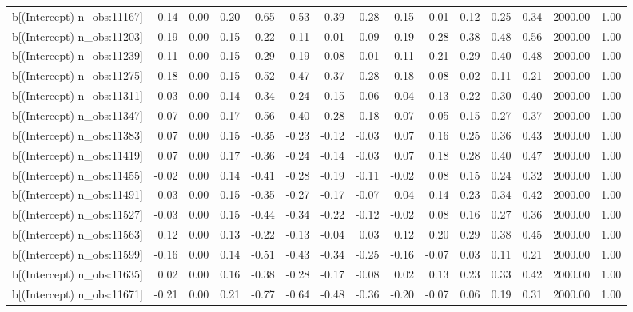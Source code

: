 \begin{table}[ht]
\begin{tabular}{rrrrrrrrrrrrrrr}
  b[(Intercept) n\_obs:11167] & -0.14 & 0.00 & 0.20 & -0.65 & -0.53 & -0.39 & -0.28 & -0.15 & -0.01 & 0.12 & 0.25 & 0.34 & 2000.00 & 1.00 \\ 
  b[(Intercept) n\_obs:11203] & 0.19 & 0.00 & 0.15 & -0.22 & -0.11 & -0.01 & 0.09 & 0.19 & 0.28 & 0.38 & 0.48 & 0.56 & 2000.00 & 1.00 \\ 
  b[(Intercept) n\_obs:11239] & 0.11 & 0.00 & 0.15 & -0.29 & -0.19 & -0.08 & 0.01 & 0.11 & 0.21 & 0.29 & 0.40 & 0.48 & 2000.00 & 1.00 \\ 
  b[(Intercept) n\_obs:11275] & -0.18 & 0.00 & 0.15 & -0.52 & -0.47 & -0.37 & -0.28 & -0.18 & -0.08 & 0.02 & 0.11 & 0.21 & 2000.00 & 1.00 \\ 
  b[(Intercept) n\_obs:11311] & 0.03 & 0.00 & 0.14 & -0.34 & -0.24 & -0.15 & -0.06 & 0.04 & 0.13 & 0.22 & 0.30 & 0.40 & 2000.00 & 1.00 \\ 
  b[(Intercept) n\_obs:11347] & -0.07 & 0.00 & 0.17 & -0.56 & -0.40 & -0.28 & -0.18 & -0.07 & 0.05 & 0.15 & 0.27 & 0.37 & 2000.00 & 1.00 \\ 
  b[(Intercept) n\_obs:11383] & 0.07 & 0.00 & 0.15 & -0.35 & -0.23 & -0.12 & -0.03 & 0.07 & 0.16 & 0.25 & 0.36 & 0.43 & 2000.00 & 1.00 \\ 
  b[(Intercept) n\_obs:11419] & 0.07 & 0.00 & 0.17 & -0.36 & -0.24 & -0.14 & -0.03 & 0.07 & 0.18 & 0.28 & 0.40 & 0.47 & 2000.00 & 1.00 \\ 
  b[(Intercept) n\_obs:11455] & -0.02 & 0.00 & 0.14 & -0.41 & -0.28 & -0.19 & -0.11 & -0.02 & 0.08 & 0.15 & 0.24 & 0.32 & 2000.00 & 1.00 \\ 
  b[(Intercept) n\_obs:11491] & 0.03 & 0.00 & 0.15 & -0.35 & -0.27 & -0.17 & -0.07 & 0.04 & 0.14 & 0.23 & 0.34 & 0.42 & 2000.00 & 1.00 \\ 
  b[(Intercept) n\_obs:11527] & -0.03 & 0.00 & 0.15 & -0.44 & -0.34 & -0.22 & -0.12 & -0.02 & 0.08 & 0.16 & 0.27 & 0.36 & 2000.00 & 1.00 \\ 
  b[(Intercept) n\_obs:11563] & 0.12 & 0.00 & 0.13 & -0.22 & -0.13 & -0.04 & 0.03 & 0.12 & 0.20 & 0.29 & 0.38 & 0.45 & 2000.00 & 1.00 \\ 
  b[(Intercept) n\_obs:11599] & -0.16 & 0.00 & 0.14 & -0.51 & -0.43 & -0.34 & -0.25 & -0.16 & -0.07 & 0.03 & 0.11 & 0.21 & 2000.00 & 1.00 \\ 
  b[(Intercept) n\_obs:11635] & 0.02 & 0.00 & 0.16 & -0.38 & -0.28 & -0.17 & -0.08 & 0.02 & 0.13 & 0.23 & 0.33 & 0.42 & 2000.00 & 1.00 \\ 
  b[(Intercept) n\_obs:11671] & -0.21 & 0.00 & 0.21 & -0.77 & -0.64 & -0.48 & -0.36 & -0.20 & -0.07 & 0.06 & 0.19 & 0.31 & 2000.00 & 1.00 \\ 

\end{tabular}
\end{table}
